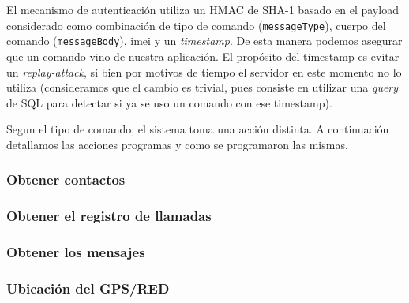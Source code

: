 El mecanismo de autenticación utiliza un HMAC de SHA-1 basado en el payload considerado como combinación de tipo de comando (\texttt{messageType}),
cuerpo del comando (\texttt{messageBody}), imei y un \textit{timestamp}. De esta manera podemos asegurar que un comando vino de nuestra
aplicación. El propósito del timestamp es evitar un \textit{replay-attack}, si bien por motivos de tiempo el servidor en este momento no lo
utiliza (consideramos que el cambio es trivial, pues consiste en utilizar una \textit{query} de SQL para detectar si ya se uso un comando con
ese timestamp).

Segun el tipo de comando, el sistema toma una acción distinta. A continuación detallamos las acciones programas y como se programaron las mismas.

\subsubsection{Obtener contactos}
\subsubsection{Obtener el registro de llamadas}
\subsubsection{Obtener los mensajes}

\subsubsection{Ubicación del GPS/RED}
%
%
%
    

